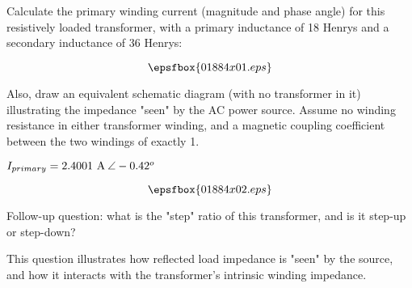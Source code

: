 

Calculate the primary winding current (magnitude and phase angle) for this resistively loaded transformer, with a primary inductance of 18 Henrys and a secondary inductance of 36 Henrys:

$$\epsfbox{01884x01.eps}$$

Also, draw an equivalent schematic diagram (with no transformer in it) illustrating the impedance "seen" by the AC power source.  Assume no winding resistance in either transformer winding, and a magnetic coupling coefficient between the two windings of exactly 1.







$I_{primary} = 2.4001 \hbox{ A} \> \angle -0.42^o$

$$\epsfbox{01884x02.eps}$$

\vskip 10pt

Follow-up question: what is the "step" ratio of this transformer, and is it step-up or step-down?







This question illustrates how reflected load impedance is "seen" by the source, and how it interacts with the transformer's intrinsic winding impedance.





